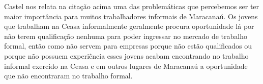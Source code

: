 Castel nos relata na citação acima uma das problemáticas que percebemos ser ter 
maior importância para muitos trabalhadores informais de Maracanaú. Os jovens 
que trabalham na Ceasa informalmente geralmente procura oportunidade lá por não 
terem qualificação nenhuma para poder ingressar no mercado de trabalho formal, 
então como não servem para empresas porque não estão qualificados ou porque não 
possuem experiência esses jovens acabam encontrando no trabalho informal 
exercido na Ceasa e em outros lugares de Maracanaú a oportunidade que não 
encontraram no trabalho formal.